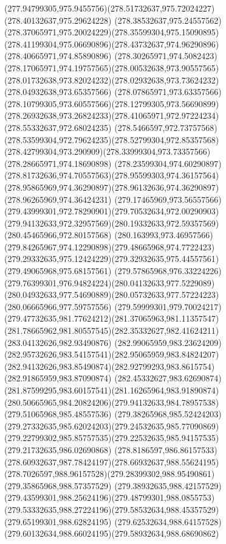 {{\curveto(277.94799305,975.9455756)(278.51732637,975.72024227)(278.40132637,975.29624228)
\curveto(278.38532637,975.24557562)(278.37065971,975.20024229)(278.35599304,975.15090895)
\curveto(278.41199304,975.06690896)(278.43732637,974.96290896)(278.40665971,974.85890896)
\curveto(278.30265971,974.5082423)(278.17065971,974.19757565)(278.00532638,973.90557565)
\curveto(278.01732638,973.82024232)(278.02932638,973.73624232)(278.04932638,973.65357566)
\curveto(278.07865971,973.63357566)(278.10799305,973.60557566)(278.12799305,973.56690899)
\curveto(278.26932638,973.26824233)(278.41065971,972.97224234)(278.55332637,972.68024235)
\curveto(278.5466597,972.73757568)(278.53599304,972.79624235)(278.52799304,972.85357568)
\curveto(278.42799304,973.290909)(278.33999304,973.73357566)(278.28665971,974.18690898)
\curveto(278.23599304,974.60290897)(278.81732636,974.70557563)(278.95599303,974.36157564)
\curveto(278.95865969,974.36290897)(278.96132636,974.36290897)(278.96265969,974.36424231)
\curveto(279.17465969,973.56557566)(279.43999301,972.78290901)(279.70532634,972.00290903)
\curveto(279.94132633,972.32957569)(280.19332633,972.59357569)(280.45465966,972.80157568)
\curveto(280.163993,973.46957566)(279.84265967,974.12290898)(279.48665968,974.7722423)
\curveto(279.29332635,975.12424229)(279.32932635,975.44557561)(279.49065968,975.68157561)
\curveto(279.57865968,976.33224226)(279.76399301,976.94824224)(280.04132633,977.5229089)
\curveto(280.04932633,977.54690889)(280.05732633,977.57224223)(280.06665966,977.59757556)
\curveto(279.59999301,979.70024217)(279.47732635,981.77624212)(281.37065963,981.11357547)
\curveto(281.78665962,981.80557545)(282.35332627,982.41624211)(283.04132626,982.93490876)
\curveto(282.99065959,983.23624209)(282.95732626,983.54157541)(282.95065959,983.84824207)
\curveto(282.94132626,983.85490874)(282.92799293,983.8615754)(282.91865959,983.87090874)
\curveto(282.45332627,983.62690874)(281.87599295,983.60157541)(281.16265964,983.91890874)
\curveto(280.50665965,984.20824206)(279.94132633,984.78957538)(279.51065968,985.48557536)
\curveto(279.38265968,985.52424203)(279.27332635,985.62024203)(279.24532635,985.77090869)
\curveto(279.22799302,985.85757535)(279.22532635,985.94157535)(279.21732635,986.02690868)
\curveto(278.8186597,986.86157533)(278.60932637,987.78424197)(278.66932637,988.55624195)
\curveto(278.7026597,988.96157528)(279.28399302,988.95490861)(279.35865968,988.57357529)
\curveto(279.38932635,988.42157529)(279.43599301,988.25624196)(279.48799301,988.0855753)
\curveto(279.53332635,988.27224196)(279.58532634,988.45357529)(279.65199301,988.62824195)
\curveto(279.62532634,988.64157528)(279.60132634,988.66024195)(279.58932634,988.68690862)
}}
